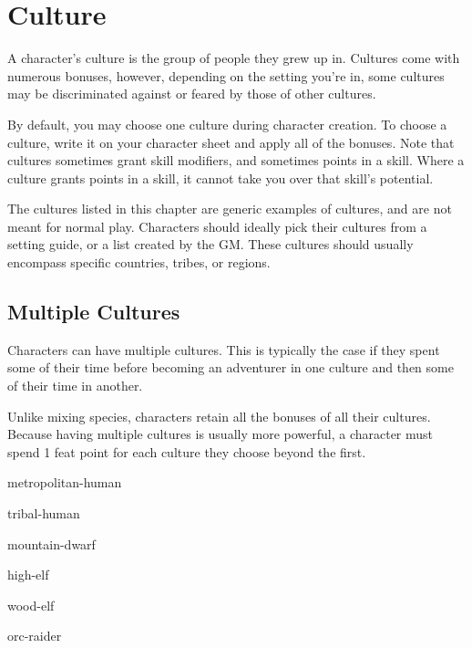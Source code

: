 \chapter{Culture}\label{culture}

\begin{multicols*}{2}
    A character's culture is the group of people they grew up in. Cultures come
    with numerous bonuses, however, depending on the setting you're in, some
    cultures may be discriminated against or feared by those of other cultures.

    By default, you may choose one culture during character creation. To choose a
    culture, write it on your character sheet and apply all of the bonuses. Note
    that cultures sometimes grant skill modifiers, and sometimes points in a skill.
    Where a culture grants points in a skill, it cannot take you over that skill's
    potential.

    The cultures listed in this chapter are generic examples of cultures, and are
    not meant for normal play. Characters should ideally pick their cultures from
    a setting guide, or a list created by the GM. These cultures should usually
    encompass specific countries, tribes, or regions.

    \section{Multiple Cultures}
    Characters can have multiple cultures. This is typically the case if they spent
    some of their time before becoming an adventurer in one culture and then some
    of their time in another.

    Unlike mixing species, characters retain all the bonuses of all their cultures.
    Because having multiple cultures is usually more powerful, a character must
    spend 1 feat point for each culture they choose beyond the first.

    {metropolitan-human}

    {tribal-human}

    {mountain-dwarf}

    {high-elf}

    {wood-elf}

    {orc-raider}
\end{multicols*}
